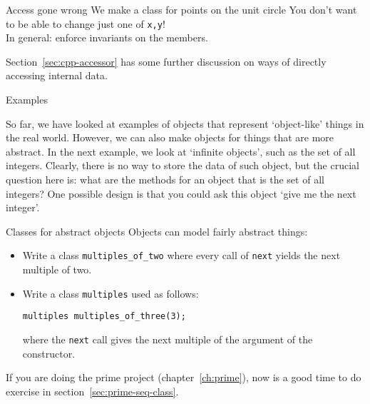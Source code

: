 \begin{block}{Access gone wrong}
  \label{sl:privatenogoo}
  We make a class for points on the unit circle
  \lstset{style=snippetcode}
  You don't want to be able to change just one of \lstinline{x,y}!\\
  In general: enforce invariants on the members.
\end{block}

Section~\ref{sec:cpp-accessor} has some further discussion on ways
of directly accessing internal data.

 {Examples}

So far, we have looked at examples of objects that represent
`object-like' things in the real world.
However, we can also make objects for things
that are more abstract.
In the next example, we look at `infinite objects',
such as the set of all integers.
Clearly, there is no way to store the data of such object,
but the crucial question here is: what are the methods
for an object that is the set of all integers?
One possible design is that you could ask this object
`give me the next integer'.

\begin{block}{Classes for abstract objects}
  \label{sl:intstream}
  Objects can model fairly abstract things:
\end{block}

\begin{exercise}
  \label{ex:mult-two}
  \begin{itemize}
  \item
    Write a class \lstinline{multiples_of_two} where every call of
    \lstinline{next} yields the next multiple of two. 
  \item Write a class \lstinline{multiples} used as follows:
\begin{lstlisting}
multiples multiples_of_three(3);      
\end{lstlisting}
  where the \lstinline{next} call gives the next multiple of the
  argument of the constructor.
  \end{itemize}
\end{exercise}

\begin{exercise}
  If you are doing the prime project (chapter~\ref{ch:prime}),
  now is a good time to do exercise in section~\ref{sec:prime-seq-class}.
\end{exercise}

